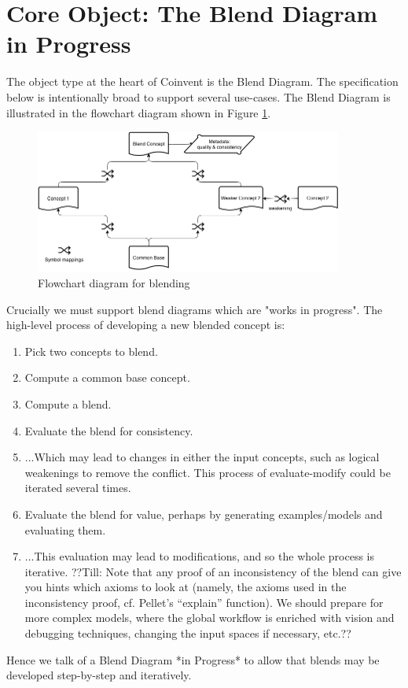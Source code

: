 \documentclass[10pt]{article}
\begin{document}
\section{Core Object: The Blend Diagram in Progress}\label{sec:bdip}

The object type at the heart of Coinvent is the Blend Diagram. The specification below is intentionally broad to support several use-cases. The Blend Diagram is illustrated in the flowchart diagram shown in Figure \ref{fig:flowchart}.

\begin{figure}[!ht]
\includegraphics[width=0.9\textwidth]{BlendDiagram.png}
\caption{Flowchart diagram for blending}
\label{fig:flowchart}
\end{figure}


Crucially we must support blend diagrams which are "works in progress". The high-level process of developing a new blended concept is:
\begin{enumerate}
\item Pick two concepts to blend.
\item Compute a common base concept.
\item Compute a blend.
\item Evaluate the blend for consistency.
\item ...Which may lead to changes in either the input concepts, such as logical weakenings to remove the conflict. This process of evaluate-modify could be iterated several times.
\item Evaluate the blend for value, perhaps by generating examples/models and evaluating them.
\item ...This evaluation may lead to modifications, and so the whole process is iterative.
??Till: Note that any proof of an inconsistency of the blend can give you hints which axioms to look at (namely, the axioms used in the inconsistency proof, cf. Pellet's ``explain'' function).
We should prepare for more complex models, where the global workflow is enriched with vision and debugging techniques, changing the input spaces if necessary, etc.??
\end{enumerate}
Hence we talk of a Blend Diagram *in Progress* to allow that blends may be developed step-by-step and iteratively.
\end{document}
